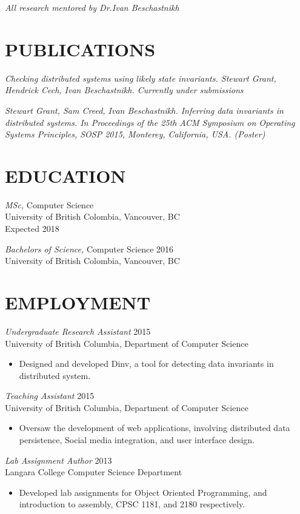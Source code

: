 \documentclass[line,margin]{res}
\begin{document}
\begin{resume}
{\sl \textit{All research mentored by Dr.Ivan Beschastnikh}}\\

\section{PUBLICATIONS}

{\sl 
    Checking distributed systems using likely state invariants. 
    Stewart Grant, Hendrick Cech, Ivan Beschastnikh. 
    \it{Currently under submissions}}

{\sl Stewart Grant, Sam Creed, Ivan Beschastnikh. Inferring data invariants in distributed systems. In \it{Proceedings of the 25th ACM Symposium on Operating Systems Principles, SOSP 2015}, Monterey, California, USA. (Poster)}

\section{EDUCATION}
{\sl MSc,} Computer Science\\
University of British Colombia, Vancouver, BC \\
Expected 2018

{\sl Bachelors of Science,} Computer Science	\hfill 2016\\
University of British Colombia, Vancouver, BC \\


\section{EMPLOYMENT} 
{\sl Undergraduate Research Assistant} \hfill 2015\\
	University of British Columbia, Department of Computer Science
\begin{itemize} \itemsep -2pt
        \item Designed and developed Dinv, a tool for detecting data invariants in distributed system.
    \end{itemize}
{\sl Teaching Assistant} \hfill 2015\\
	University of British Columbia, Department of Computer Science
\begin{itemize} \itemsep -2pt
		\item Oversaw the development of web applications, involving distributed data persistence, Social media integration, and user interface design.
	\end{itemize}
{\sl Lab Assignment Author} \hfill 2013\\
	Langara College Computer Science Department
	\begin{itemize} \itemsep -2pt
			\item Developed lab assignments for Object Oriented Programming, and introduction to assembly, CPSC 1181, and 2180 respectively.
	\end{itemize}


\end{resume}
\end{document}
